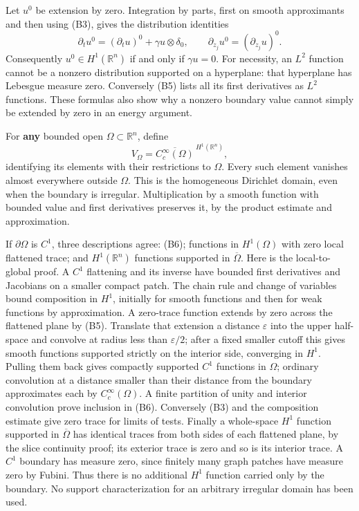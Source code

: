 \documentclass[
  11pt,
]{article}
\begin{document}
Let \(u^0\) be extension by zero. Integration by parts, first on smooth
approximants and then using (B3), gives the distribution identities \[
 \partial_t u^0=(\partial_tu)^0+\gamma u\otimes\delta_0,
 \qquad \partial_{z_j}u^0=(\partial_{z_j}u)^0. \tag{B5}
\] Consequently \(u^0\in H^1(\mathbb R^n)\) if and only if
\(\gamma u=0\). For necessity, an \(L^2\) function cannot be a nonzero
distribution supported on a hyperplane: that hyperplane has Lebesgue
measure zero. Conversely (B5) lists all its first derivatives as \(L^2\)
functions. These formulas also show why a nonzero boundary value cannot
simply be extended by zero in an energy argument.

For \textbf{any} bounded open \(\Omega\subset\mathbb R^n\), define \[
 V_\Omega=\overline{C_c^\infty(\Omega)}^{\ H^1(\mathbb R^n)}, \tag{B6}
\] identifying its elements with their restrictions to \(\Omega\). Every
such element vanishes almost everywhere outside \(\Omega\). This is the
homogeneous Dirichlet domain, even when the boundary is irregular.
Multiplication by a smooth function with bounded value and first
derivatives preserves it, by the product estimate and approximation.

If \(\partial\Omega\) is \(C^1\), three descriptions agree: (B6);
functions in \(H^1(\Omega)\) with zero local flattened trace; and
\(H^1(\mathbb R^n)\) functions supported in \(\overline\Omega\). Here is
the local-to-global proof. A \(C^1\) flattening and its inverse have
bounded first derivatives and Jacobians on a smaller compact patch. The
chain rule and change of variables bound composition in \(H^1\),
initially for smooth functions and then for weak functions by
approximation. A zero-trace function extends by zero across the
flattened plane by (B5). Translate that extension a distance
\(\varepsilon\) into the upper half-space and convolve at radius less
than \(\varepsilon/2\); after a fixed smaller cutoff this gives smooth
functions supported strictly on the interior side, converging in
\(H^1\). Pulling them back gives compactly supported \(C^1\) functions
in \(\Omega\); ordinary convolution at a distance smaller than their
distance from the boundary approximates each by \(C_c^\infty(\Omega)\).
A finite partition of unity and interior convolution prove inclusion in
(B6). Conversely (B3) and the composition estimate give zero trace for
limits of tests. Finally a whole-space \(H^1\) function supported in
\(\overline\Omega\) has identical traces from both sides of each
flattened plane, by the slice continuity proof; its exterior trace is
zero and so is its interior trace. A \(C^1\) boundary has measure zero,
since finitely many graph patches have measure zero by Fubini. Thus
there is no additional \(H^1\) function carried only by the boundary. No
support characterization for an arbitrary irregular domain has been
used.
\end{document}
